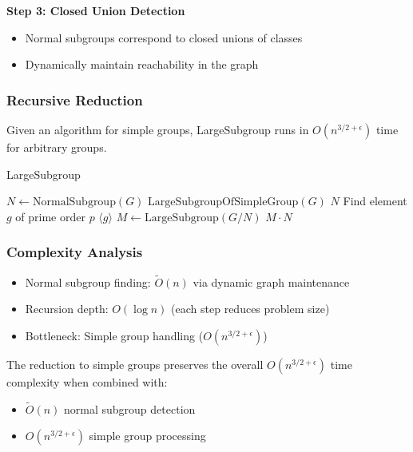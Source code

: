 \documentclass[sigconf]{acmart}
\begin{document}
\textbf{Step 3: Closed Union Detection}
\begin{itemize}
    \item Normal subgroups correspond to closed unions of classes
    \item Dynamically maintain reachability in the graph
\end{itemize}

\subsubsection{Recursive Reduction}
\begin{lemma}[6.2]
Given an algorithm for simple groups, LargeSubgroup runs in \( O(n^{3/2+\epsilon}) \) time for arbitrary groups.
\end{lemma}

\begin{algorithm}[H]
\caption{LargeSubgroup}
\begin{algorithmic}[1]
\STATE \( N \gets \text{NormalSubgroup}(G) \)
    \RETURN \(\text{LargeSubgroupOfSimpleGroup}(G)\)
    \RETURN \( N \)
    \STATE Find element \( g \) of prime order \( p \)
    \RETURN \( \langle g \rangle \)
\ELSE
    \STATE \( M \gets \text{LargeSubgroup}(G/N) \)
    \RETURN \( M \cdot N \)
\ENDIF
\end{algorithmic}
\end{algorithm}

\subsubsection{Complexity Analysis}
\begin{itemize}
    \item Normal subgroup finding: \( \widetilde{O}(n) \) via dynamic graph maintenance
    \item Recursion depth: \( O(\log n) \) (each step reduces problem size)
    \item Bottleneck: Simple group handling (\( O(n^{3/2+\epsilon}) \))
\end{itemize}

\begin{theorem}
The reduction to simple groups preserves the overall \( O(n^{3/2+\epsilon}) \) time complexity when combined with:
\begin{itemize}
    \item \( \widetilde{O}(n) \) normal subgroup detection
    \item \( O(n^{3/2+\epsilon}) \) simple group processing
\end{itemize}
\end{theorem}
\end{document}
